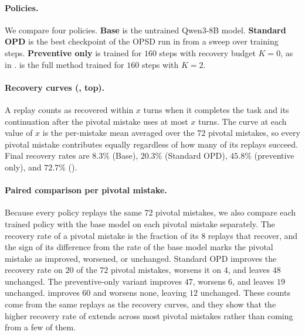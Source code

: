 \paragraph{Policies.} We compare four policies. \textbf{Base} is the untrained Qwen3-8B model. \textbf{Standard OPD} is the best checkpoint of the OPSD run in  from a sweep over training steps. \textbf{Preventive only} is \method{} trained for $160$ steps with recovery budget $K = 0$, as in . \textbf{\method{}} is the full method trained for $160$ steps with $K = 2$.

\paragraph{Recovery curves (, top).} A replay counts as recovered within $x$ turns when it completes the task and its continuation after the pivotal mistake uses at most $x$ turns. The curve at each value of $x$ is the per-mistake mean averaged over the $72$ pivotal mistakes, so every pivotal mistake contributes equally regardless of how many of its replays succeed. Final recovery rates are $8.3\%$ (Base), $20.3\%$ (Standard OPD), $45.8\%$ (preventive only), and $72.7\%$ (\method{}).

\paragraph{Paired comparison per pivotal mistake.} Because every policy replays the same $72$ pivotal mistakes, we also compare each trained policy with the base model on each pivotal mistake separately. The recovery rate of a pivotal mistake is the fraction of its $8$ replays that recover, and the sign of its difference from the rate of the base model marks the pivotal mistake as improved, worsened, or unchanged. Standard OPD improves the recovery rate on $20$ of the $72$ pivotal mistakes, worsens it on $4$, and leaves $48$ unchanged. The preventive-only variant improves $47$, worsens $6$, and leaves $19$ unchanged. \method{} improves $60$ and worsens none, leaving $12$ unchanged. These counts come from the same replays as the recovery curves, and they show that the higher recovery rate of \method{} extends across most pivotal mistakes rather than coming from a few of them.

